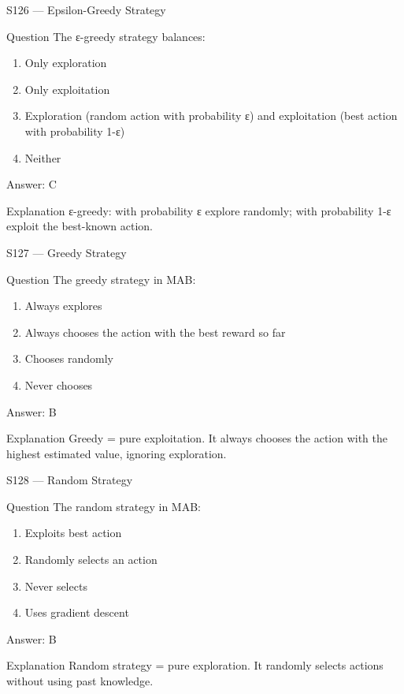 \documentclass[aspectratio=169,8pt]{beamer}
\begin{document}
	\begin{frame}{S126 --- Epsilon-Greedy Strategy}
		\begin{block}{Question}
			The ε-greedy strategy balances:
			\begin{enumerate}
				\item Only exploration
				\item Only exploitation
				\item Exploration (random action with probability ε) and exploitation (best action with probability 1-ε)
				\item Neither
			\end{enumerate}
		\end{block}
		\begin{exampleblock}{Answer: C}\end{exampleblock}
		\begin{block}{Explanation}
			ε-greedy: with probability ε explore randomly; with probability 1-ε exploit the best-known action.
		\end{block}
	\end{frame}
	
	\begin{frame}{S127 --- Greedy Strategy}
		\begin{block}{Question}
			The greedy strategy in MAB:
			\begin{enumerate}
				\item Always explores
				\item Always chooses the action with the best reward so far
				\item Chooses randomly
				\item Never chooses
			\end{enumerate}
		\end{block}
		\begin{exampleblock}{Answer: B}\end{exampleblock}
		\begin{block}{Explanation}
			Greedy = pure exploitation. It always chooses the action with the highest estimated value, ignoring exploration.
		\end{block}
	\end{frame}
	
	\begin{frame}{S128 --- Random Strategy}
		\begin{block}{Question}
			The random strategy in MAB:
			\begin{enumerate}
				\item Exploits best action
				\item Randomly selects an action
				\item Never selects
				\item Uses gradient descent
			\end{enumerate}
		\end{block}
		\begin{exampleblock}{Answer: B}\end{exampleblock}
		\begin{block}{Explanation}
			Random strategy = pure exploration. It randomly selects actions without using past knowledge.
		\end{block}
	\end{frame}
	
\end{document}
